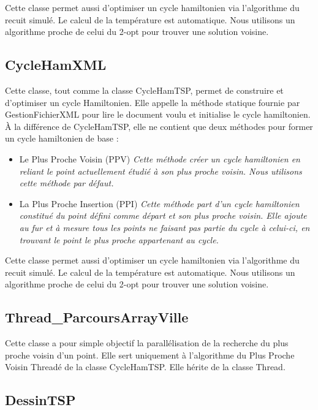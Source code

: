 \documentclass{article}
\begin{document}
Cette classe permet aussi d'optimiser un cycle hamiltonien via l'algorithme du recuit simulé.
Le calcul de la température est automatique.
Nous utilisons un algorithme proche de celui du 2-opt pour trouver une solution voisine.

\subsection{CycleHamXML}

Cette classe, tout comme la classe CycleHamTSP, permet de construire et d'optimiser un cycle Hamiltonien.
Elle appelle la méthode statique fournie par GestionFichierXML pour lire le document voulu et initialise le cycle hamiltonien.
À la différence de CycleHamTSP, elle ne contient que deux méthodes pour former un cycle hamiltonien de base :

\begin{itemize}
\item Le Plus Proche Voisin (PPV) \emph{Cette méthode créer un cycle hamiltonien en reliant le point actuellement étudié à son plus proche voisin. Nous utilisons cette méthode par défaut.}\smallskip

\item La Plus Proche Insertion (PPI) \emph{Cette méthode part d'un cycle hamiltonien constitué du point défini comme départ et son plus proche voisin. Elle ajoute au fur et à mesure tous les points ne faisant pas partie du cycle à celui-ci, en trouvant le point le plus proche appartenant au cycle.}
\end{itemize}

Cette classe permet aussi d'optimiser un cycle hamiltonien via l'algorithme du recuit simulé.
Le calcul de la température est automatique.
Nous utilisons un algorithme proche de celui du 2-opt pour trouver une solution voisine.

\subsection{Thread\_ParcoursArrayVille}

Cette classe a pour simple objectif la parallélisation de la recherche du plus proche voisin d'un point.
Elle sert uniquement à l'algorithme du Plus Proche Voisin Threadé de la classe CycleHamTSP.
Elle hérite de la classe Thread.

\subsection{DessinTSP}
\end{document}
